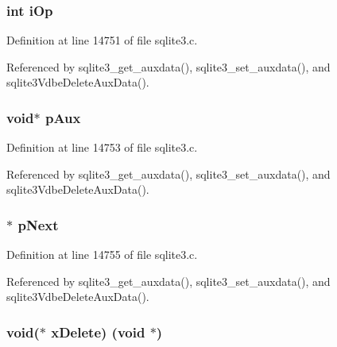 \hypertarget{struct_aux_data_a7d4638420dcef0fb9e0120bad40857e3}{}
\subsubsection[{i\+Op}]{\setlength{\rightskip}{0pt plus 5cm}int i\+Op}\label{struct_aux_data_a7d4638420dcef0fb9e0120bad40857e3}


Definition at line 14751 of file sqlite3.\+c.



Referenced by sqlite3\+\_\+get\+\_\+auxdata(), sqlite3\+\_\+set\+\_\+auxdata(), and sqlite3\+Vdbe\+Delete\+Aux\+Data().

\hypertarget{struct_aux_data_aae735e24d027e9a5d3e39ab9de5c166b}{}
\subsubsection[{p\+Aux}]{\setlength{\rightskip}{0pt plus 5cm}void$\ast$ p\+Aux}\label{struct_aux_data_aae735e24d027e9a5d3e39ab9de5c166b}


Definition at line 14753 of file sqlite3.\+c.



Referenced by sqlite3\+\_\+get\+\_\+auxdata(), sqlite3\+\_\+set\+\_\+auxdata(), and sqlite3\+Vdbe\+Delete\+Aux\+Data().

\hypertarget{struct_aux_data_a1b254db36b3e616c8152d0d0546750a0}{}
\subsubsection[{p\+Next}]{$\ast$ p\+Next}\label{struct_aux_data_a1b254db36b3e616c8152d0d0546750a0}


Definition at line 14755 of file sqlite3.\+c.



Referenced by sqlite3\+\_\+get\+\_\+auxdata(), sqlite3\+\_\+set\+\_\+auxdata(), and sqlite3\+Vdbe\+Delete\+Aux\+Data().

\hypertarget{struct_aux_data_af8a71a795985052cc4c2eab5985f8551}{}
\subsubsection[{x\+Delete}]{\setlength{\rightskip}{0pt plus 5cm}void($\ast$ x\+Delete) (void $\ast$)}\label{struct_aux_data_af8a71a795985052cc4c2eab5985f8551}


